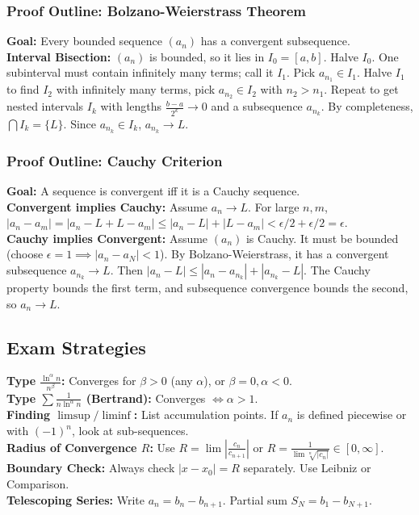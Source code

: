 \subsubsection{Proof Outline: Bolzano-Weierstrass Theorem}
\textbf{Goal:} Every bounded sequence $(a_n)$ has a convergent subsequence. \\
\textbf{Interval Bisection:} $(a_n)$ is bounded, so it lies in $I_0 = [a, b]$. Halve $I_0$. One subinterval must contain infinitely many terms; call it $I_1$. Pick $a_{n_1} \in I_1$. Halve $I_1$ to find $I_2$ with infinitely many terms, pick $a_{n_2} \in I_2$ with $n_2 > n_1$. Repeat to get nested intervals $I_k$ with lengths $\frac{b-a}{2^k} \to 0$ and a subsequence $a_{n_k}$. By completeness, $\bigcap I_k = \{L\}$. Since $a_{n_k} \in I_k$, $a_{n_k} \to L$.

\subsubsection{Proof Outline: Cauchy Criterion}
\textbf{Goal:} A sequence is convergent iff it is a Cauchy sequence. \\
\textbf{Convergent implies Cauchy:} Assume $a_n \to L$. For large $n, m$, $|a_n - a_m| = |a_n - L + L - a_m| \le |a_n - L| + |L - a_m| < \epsilon/2 + \epsilon/2 = \epsilon$. \\
\textbf{Cauchy implies Convergent:} Assume $(a_n)$ is Cauchy. It must be bounded (choose $\epsilon=1 \implies |a_n - a_N| < 1$). By Bolzano-Weierstrass, it has a convergent subsequence $a_{n_k} \to L$. Then $|a_n - L| \le |a_n - a_{n_k}| + |a_{n_k} - L|$. The Cauchy property bounds the first term, and subsequence convergence bounds the second, so $a_n \to L$.

\subsection{Exam Strategies}

\textbf{Type $\frac{\ln^\alpha n}{n^\beta}$:} Converges for $\beta > 0$ (any $\alpha$), or $\beta=0, \alpha < 0$. \\
\textbf{Type $\sum \frac{1}{n \ln^\alpha n}$ (Bertrand):} Converges $\iff \alpha > 1$. \\
\textbf{Finding $\limsup / \liminf$:} List accumulation points. If $a_n$ is defined piecewise or with $(-1)^n$, look at sub-sequences. \\
\textbf{Radius of Convergence $R$:} Use $R = \lim |\frac{c_n}{c_{n+1}}|$ or $R = \frac{1}{\lim \sqrt[n]{|c_n|}} \in [0, \infty]$. \\
\textbf{Boundary Check:} Always check $|x-x_0|=R$ separately. Use Leibniz or Comparison. \\
\textbf{Telescoping Series:} Write $a_n = b_n - b_{n+1}$. Partial sum $S_N = b_1 - b_{N+1}$.

